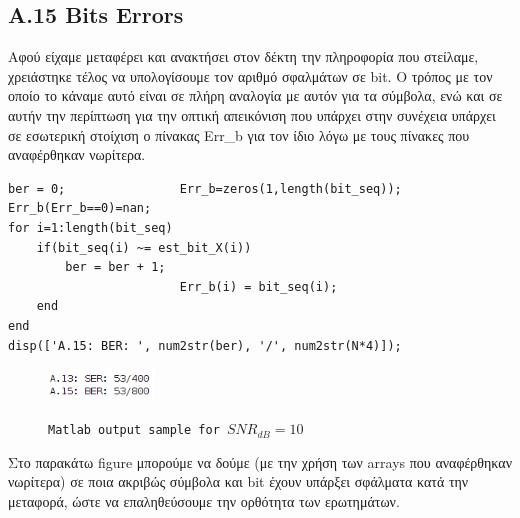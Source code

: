 \documentclass[11pt]{article}
\begin{document}
    \subsection*{A.15 Bits Errors}
    Αφού είχαμε μεταφέρει και ανακτήσει στον δέκτη την πληροφορία που στείλαμε, χρειάστηκε τέλος να υπολογίσουμε τον αριθμό σφαλμάτων σε bit.
    Ο τρόπος με τον οποίο το κάναμε αυτό είναι σε πλήρη αναλογία με αυτόν για τα σύμβολα, ενώ και σε αυτήν την περίπτωση για την οπτική απεικόνιση που υπάρχει στην συνέχεια υπάρχει σε εσωτερική στοίχιση ο πίνακας Err\_b για τον ίδιο λόγω με τους πίνακες που αναφέρθηκαν νωρίτερα.
    
    \newpage
    \begin{lstlisting}[caption = {A.15 \texttt{}}]
% A.15
ber = 0;                Err_b=zeros(1,length(bit_seq)); Err_b(Err_b==0)=nan;
for i=1:length(bit_seq)
    if(bit_seq(i) ~= est_bit_X(i))
        ber = ber + 1;
                        Err_b(i) = bit_seq(i); 
    end
end
disp(['A.15: BER: ', num2str(ber), '/', num2str(N*4)]); 
    \end{lstlisting}
    
    \begin{figure}[H]
        \centering
        \includegraphics[scale=0.5, width=0.25\textwidth]{img/A13_a15.png} \\
        \caption{\texttt{Matlab output sample for $SNR_{dB}=10$}}
    \end{figure}
    
    \par \noindent
    Στο παρακάτω figure μπορούμε να δούμε (με την χρήση των arrays που αναφέρθηκαν νωρίτερα) σε ποια ακριβώς σύμβολα και bit έχουν υπάρξει σφάλματα κατά την μεταφορά, ώστε να επαληθεύσουμε την ορθότητα των ερωτημάτων. 
    
\end{document}
